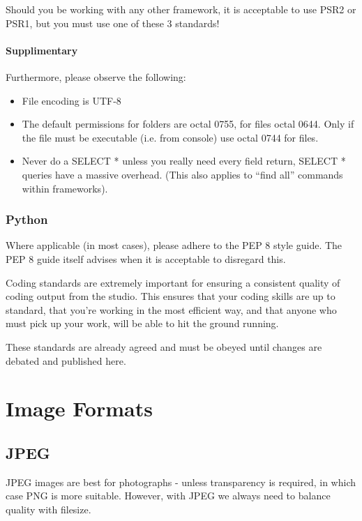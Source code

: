 \documentclass[letterpaper,10pt,english]{sphinxmanual}
\begin{document}
Should you be working with any other framework, it is acceptable to use PSR2 or PSR1, but you must use one of these 3 standards!


\subsubsection{Supplimentary}
\label{coding_standards/backend_standards:supplimentary}
Furthermore, please observe the following:
\begin{itemize}
\item {} 
File encoding is UTF-8

\item {} 
The default permissions for folders are octal 0755, for files octal 0644. Only if the file must be executable (i.e. from console) use octal 0744 for files.

\item {} 
Never do a SELECT * unless you really need every field return, SELECT * queries have a massive overhead. (This also applies to ``find all'' commands within frameworks).

\end{itemize}


\subsection{Python}
\label{coding_standards/backend_standards:python}
Where applicable (in most cases), please adhere to the PEP 8 style guide.  The PEP 8 guide itself advises when it is acceptable to disregard this.

Coding standards are extremely important for ensuring a consistent quality of
coding output from the studio. This ensures that your coding skills are up to
standard, that you're working in the most efficient way, and that anyone who
must pick up your work, will be able to hit the ground running.

These standards are already agreed and must be obeyed until changes are debated
and published here.


\chapter{Image Formats}
\label{image_formats::doc}\label{image_formats:image-formats}

\section{JPEG}
\label{image_formats:jpeg}
JPEG images are best for photographs - unless transparency is required, in which case PNG is more suitable. However, with JPEG we always need to balance quality with filesize.
\end{document}

